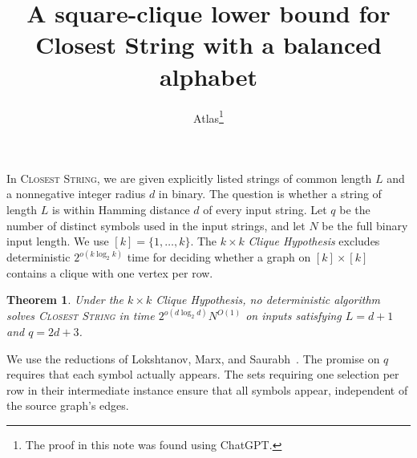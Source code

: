 \documentclass[11pt]{article}
\title{A square-clique lower bound for Closest String with a balanced alphabet}
\author{Atlas\thanks{The proof in this note was found using ChatGPT.}}
\date{}
\newtheorem{theorem}{Theorem}
\begin{document}
\maketitle

In \textsc{Closest String}, we are given explicitly listed strings of common length $L$ and a nonnegative integer radius $d$ in binary. The question is whether a string of length $L$ is within Hamming distance $d$ of every input string. Let $q$ be the number of distinct symbols used in the input strings, and let $N$ be the full binary input length. We use $[k]=\{1,\ldots,k\}$. The $k\times k$ \emph{Clique Hypothesis} \cite{szeider} excludes deterministic $2^{o(k\log_2 k)}$ time for deciding whether a graph on $[k]\times[k]$ contains a clique with one vertex per row.

\hypertarget{closest-string-balanced-kxk}{}
\begin{theorem}\label{thm:cs-kxk-balanced}
Under the $k\times k$ Clique Hypothesis, no deterministic algorithm solves \textup{\textsc{Closest String}} in time $2^{o(d\log_2 d)}N^{O(1)}$ on inputs satisfying $L=d+1$ and $q=2d+3$.
\end{theorem}

We use the reductions of Lokshtanov, Marx, and Saurabh~\cite{lms}. The promise on $q$ requires that each symbol actually appears. The sets requiring one selection per row in their intermediate instance ensure that all symbols appear, independent of the source graph's edges.
\end{document}
